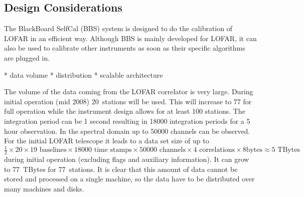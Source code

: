 \documentclass[10pt]{lofar}
\begin{document}
\subsection{Design Considerations}
\label{subsec:considerations}
The BlackBoard SelfCal (BBS) system is designed to do the calibration of LOFAR
in an efficient way. Although BBS is mainly developed for LOFAR, it can also be
used to calibrate other instruments as soon as their specific algorithms are
plugged in.

* data volume
* distribution
* scalable architecture

The volume of the data coming from the LOFAR correlator is very large. During
initial operation (mid 2008) 20~stations will be used. This will increase
to 77 for full operation while the instrument design allows for at least 100
stations. The integration period can be 1 second resulting in 18000 integration
periods for a 5 hour observation. In the spectral domain up to 50000 channels
can be observed. For the initial LOFAR telescope it leads to a data set size of
up to $\frac{1}{2} \times 20 \times 19\textrm{ baselines} \times 18000\textrm{ time stamps}
\times 50000\textrm{ channels} \times 4\textrm{ correlations} \times 8\textrm{
bytes} \approx 5\textrm{ TBytes}$ 
during initial operation (excluding flags and auxiliary information). It can
grow to 77~TBytes for 77~stations. It is clear that this amount of data cannot
be stored and processed on a single machine, so the data have to be distributed
over many machines and disks.
\end{document}
